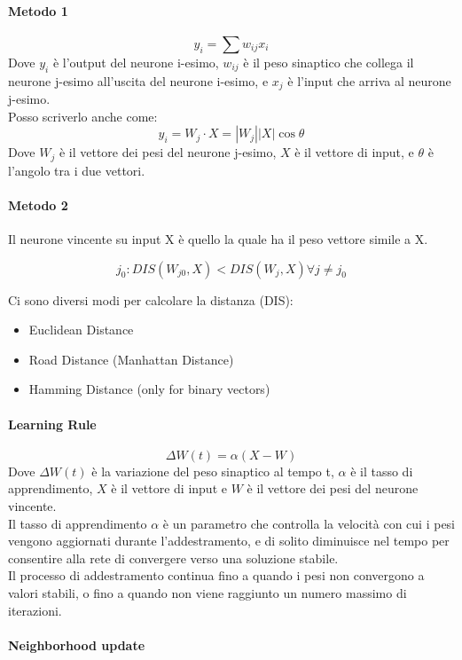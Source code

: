 \paragraph{Metodo 1}
$$y_i=\sum w_{ij} x_i$$
Dove $y_i$ è l'output del neurone i-esimo, $w_{ij}$ è il peso sinaptico che collega il neurone j-esimo all'uscita del neurone i-esimo, e $x_j$ è l'input che arriva al neurone j-esimo.\\
Posso scriverlo anche come:
$$y_i=W_j\cdot X=|W_j| |X| \cos \theta$$
Dove $W_j$ è il vettore dei pesi del neurone j-esimo, $X$ è il vettore di input, e $\theta$ è l'angolo tra i due vettori.\\

\paragraph{Metodo 2}
Il neurone vincente su input X è quello la quale ha il peso vettore simile a X.

$$j_0:DIS(W_{j0}, X)<DIS(W_j, X) \forall j\neq j_0$$

Ci sono diversi modi per calcolare la distanza (DIS):
\begin{itemize}
    \item Euclidean Distance
    \item Road Distance (Manhattan Distance)
    \item Hamming Distance (only for binary vectors)
\end{itemize}

\paragraph{Learning Rule}

$$\Delta W(t) = \alpha(X-W)$$
Dove $\Delta W(t)$ è la variazione del peso sinaptico al tempo t, $\alpha$ è il tasso di apprendimento, $X$ è il vettore di input e $W$ è il vettore dei pesi del neurone vincente.\\
Il tasso di apprendimento $\alpha$ è un parametro che controlla la velocità con cui i pesi vengono aggiornati durante l'addestramento, e di solito diminuisce nel tempo per consentire alla rete di convergere verso una soluzione stabile.\\
Il processo di addestramento continua fino a quando i pesi non convergono a valori stabili, o fino a quando non viene raggiunto un numero massimo di iterazioni.\\

\paragraph{Neighborhood update}

